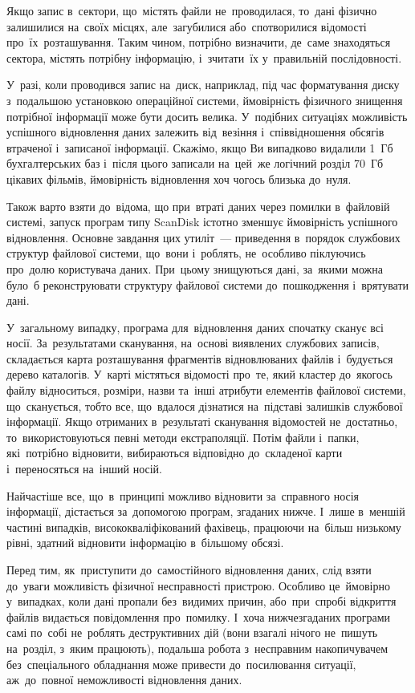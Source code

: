 \documentclass[
	a4paper,
	oneside,
	DIV = 12,
	fontsize = 13pt,
	headings = normal,
]{scrartcl}
\begin{document}
		Якщо запис в~сектори, що~містять файли не~проводилася, то~дані фізично залишилися на~своїх місцях, але~загубилися або~спотворилися відомості про~їх~розташування. Таким чином, потрібно визначити, де~саме знаходяться сектора, містять потрібну інформацію, і~зчитати~їх у~правильній послідовності. 

		У~разі, коли проводився запис на~диск, наприклад, під час форматування диску з~подальшою установкою операційної системи, ймовірність фізичного знищення потрібної інформації може бути досить велика. У~подібних ситуаціях можливість успішного відновлення даних залежить від~везіння і~співвідношення обсягів втраченої і~записаної інформації. Скажімо, якщо Ви випадково видалили 1~Гб бухгалтерських баз і~після цього записали на~цей~же логічний розділ 70~Гб цікавих фільмів, ймовірність відновлення хоч чогось близька до~нуля. 

		Також варто взяти до~відома, що при~втраті даних через помилки в~файловій системі, запуск програм типу \textenglish{ScanDisk} істотно зменшує ймовірність успішного відновлення. Основне завдання цих утиліт~— приведення в~порядок службових структур файлової системи, що~вони і~роблять, не~особливо піклуючись про~долю користувача даних. При~цьому знищуються дані, за~якими можна було~б реконструювати структуру файлової системи до~пошкодження і~врятувати дані. 

		У~загальному випадку, програма для~відновлення даних спочатку сканує всі носії. За~результатами сканування, на~основі виявлених службових записів, складається карта розташування фрагментів відновлюваних файлів і~будується дерево каталогів. У~карті містяться відомості про~те, який кластер до~якогось файлу відноситься, розміри, назви та~інші атрибути елементів файлової системи, що~сканується, тобто все, що~вдалося дізнатися на~підставі залишків службової інформації. Якщо отриманих в~результаті сканування відомостей не~достатньо, то~використовуються певні методи екстраполяції. Потім файли і~папки, які~потрібно відновити, вибираються відповідно до~складеної карти і~переносяться на~інший носій. 

		Найчастіше все, що~в~принципі можливо відновити за~справного носія інформації, дістається за~допомогою програм, згаданих нижче. І~лише в~меншій частині випадків, висококваліфікований фахівець, працюючи на~більш низькому рівні, здатний відновити інформацію в~більшому обсязі. 

		Перед тим, як~приступити до~самостійного відновлення даних, слід взяти до~уваги можливість фізичної несправності пристрою. Особливо це~ймовірно у~випадках, коли дані пропали без~видимих причин, або~при~спробі відкриття файлів видається повідомлення про~помилку. І~хоча нижчезгаданих програми самі по~собі не~роблять деструктивних дій (вони взагалі нічого не~пишуть на~розділ, з~яким працюють), подальша робота з~несправним накопичувачем без~спеціального обладнання може привести до~посилювання ситуації, аж~до~повної неможливості відновлення даних. 
\end{document}
